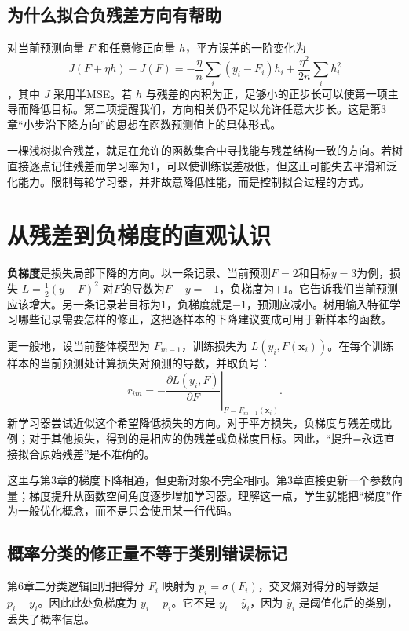 \subsection{为什么拟合负残差方向有帮助}
对当前预测向量 $F$ 和任意修正向量 $h$，平方误差的一阶变化为
\[
J(F+\eta h)-J(F)=-\frac{\eta}{n}\sum_i (y_i-F_i)h_i+\frac{\eta^2}{2n}\sum_i h_i^2
\]
，其中 $J$ 采用半MSE。若 $h$ 与残差的内积为正，足够小的正步长可以使第一项主导而降低目标。第二项提醒我们，方向相关仍不足以允许任意大步长。这是第3章“小步沿下降方向”的思想在函数预测值上的具体形式。

一棵浅树拟合残差，就是在允许的函数集合中寻找能与残差结构一致的方向。若树直接逐点记住残差而学习率为1，可以使训练误差极低，但这正可能失去平滑和泛化能力。限制每轮学习器，并非故意降低性能，而是控制拟合过程的方式。

\section{从残差到负梯度的直观认识}

\textbf{负梯度}是损失局部下降的方向。以一条记录、当前预测$F=2$和目标$y=3$为例，损失 $L=\tfrac12(y-F)^2$ 对$F$的导数为$F-y=-1$，负梯度为$+1$。它告诉我们当前预测应该增大。另一条记录若目标为1，负梯度就是$-1$，预测应减小。树用输入特征学习哪些记录需要怎样的修正，这把逐样本的下降建议变成可用于新样本的函数。

更一般地，设当前整体模型为 $F_{m-1}$，训练损失为 $L(y_i,F(\mathbf x_i))$。在每个训练样本的当前预测处计算损失对预测的导数，并取负号：
\begin{equation}
r_{im}=-\left.\frac{\partial L(y_i,F)}{\partial F}\right|_{F=F_{m-1}(\mathbf x_i)}.
\end{equation}
新学习器尝试近似这个希望降低损失的方向。对于平方损失，负梯度与残差成比例；对于其他损失，得到的是相应的伪残差或负梯度目标。因此，“提升=永远直接拟合原始残差”是不准确的。

这里与第3章的梯度下降相通，但更新对象不完全相同。第3章直接更新一个参数向量；梯度提升从函数空间角度逐步增加学习器。理解这一点，学生就能把“梯度”作为一般优化概念，而不是只会使用某一行代码。

\subsection{概率分类的修正量不等于类别错误标记}
第6章二分类逻辑回归把得分 $F_i$ 映射为 $p_i=\sigma(F_i)$，交叉熵对得分的导数是 $p_i-y_i$。因此此处负梯度为 $y_i-p_i$。它不是 $y_i-\hat y_i$，因为 $\hat y_i$ 是阈值化后的类别，丢失了概率信息。

